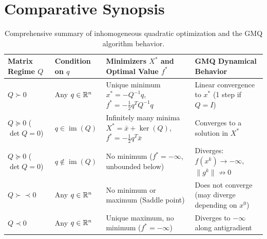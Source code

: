 \FloatBarrier
\section{Comparative Synopsis}
\label{sec:comparative-synopsis-quadratic-gmq}

\begin{table}[H]
\centering
\small
\renewcommand{\arraystretch}{1.35}
\begin{tabularx}{\textwidth}{l >{\raggedright\arraybackslash}p{2.6cm} Y >{\raggedright\arraybackslash}p{3.1cm}}
\toprule
\textbf{Matrix Regime $Q$} & \textbf{Condition on $q$} & \textbf{Minimizers $X^*$ and Optimal Value $f^*$} & \textbf{GMQ Dynamical Behavior} \\
\midrule
$Q \succ 0$ & Any $q \in \mathbb{R}^n$ & Unique minimum $x^* = -Q^{-1}q$, $f^* = -\frac{1}{2}q^T Q^{-1}q$ & Linear convergence to $x^*$ (1 step if $Q=I$) \\
$Q \succeq 0$ ($\det Q = 0$) & $q \in \operatorname{im}(Q)$ & Infinitely many minima $X^* = \bar{x} + \ker(Q)$, $f^* = -\frac{1}{2}q^T \bar{x}$ & Converges to a solution in $X^*$ \\
$Q \succeq 0$ ($\det Q = 0$) & $q \notin \operatorname{im}(Q)$ & No minimum ($f^* = -\infty$, unbounded below) & Diverges: $f(x^k) \to -\infty$, $\|g^k\| \not\to 0$ \\
$Q \succ\prec 0$ & Any $q \in \mathbb{R}^n$ & No minimum or maximum (Saddle point) & Does not converge (may diverge depending on $x^0$) \\
$Q \prec 0$ & Any $q \in \mathbb{R}^n$ & Unique maximum, no minimum ($f^* = -\infty$) & Diverges to $-\infty$ along antigradient \\
\bottomrule
\end{tabularx}
\caption{Comprehensive summary of inhomogeneous quadratic optimization and the GMQ algorithm behavior.}
\label{tab:synopsis-quadratic-gmq-en}
\end{table}
